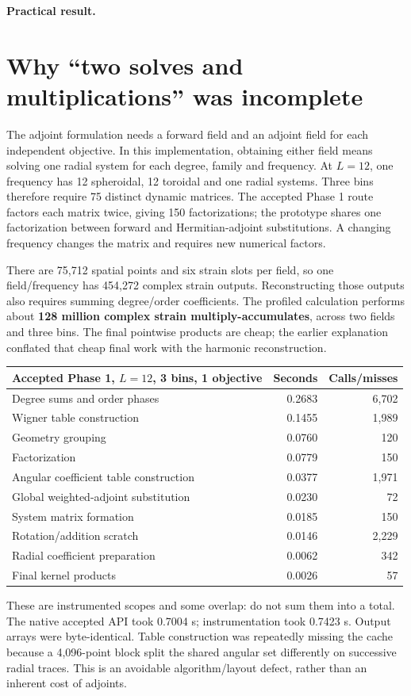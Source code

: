 \textbf{Practical result.} \HeadlineConclusion

\section{Why ``two solves and multiplications'' was incomplete}
The adjoint formulation needs a forward field and an adjoint field for each independent objective. In this implementation, obtaining either field means solving one radial system for each degree, family and frequency. At $L=12$, one frequency has 12 spheroidal, 12 toroidal and one radial systems. Three bins therefore require 75 distinct dynamic matrices. The accepted Phase 1 route factors each matrix twice, giving 150 factorizations; the prototype shares one factorization between forward and Hermitian-adjoint substitutions. A changing frequency changes the matrix and requires new numerical factors.

There are 75,712 spatial points and six strain slots per field, so one field/frequency has 454,272 complex strain outputs. Reconstructing those outputs also requires summing degree/order coefficients. The profiled calculation performs about \textbf{128 million complex strain multiply-accumulates}, across two fields and three bins. The final pointwise products are cheap; the earlier explanation conflated that cheap final work with the harmonic reconstruction.

\begin{center}
\begin{tabular}{p{}rr}
\toprule
Accepted Phase 1, $L=12$, 3 bins, 1 objective & Seconds & Calls/misses\\
\midrule
Degree sums and order phases & 0.2683 & 6,702\\
Wigner table construction & 0.1455 & 1,989\\
Geometry grouping & 0.0760 & 120\\
Factorization & 0.0779 & 150\\
Angular coefficient table construction & 0.0377 & 1,971\\
Global weighted-adjoint substitution & 0.0230 & 72\\
System matrix formation & 0.0185 & 150\\
Rotation/addition scratch & 0.0146 & 2,229\\
Radial coefficient preparation & 0.0062 & 342\\
Final kernel products & 0.0026 & 57\\
\bottomrule
\end{tabular}
\end{center}
These are instrumented scopes and some overlap: do not sum them into a total. The native accepted API took 0.7004 s; instrumentation took 0.7423 s. Output arrays were byte-identical. Table construction was repeatedly missing the cache because a 4,096-point block split the shared angular set differently on successive radial traces. This is an avoidable algorithm/layout defect, rather than an inherent cost of adjoints.


